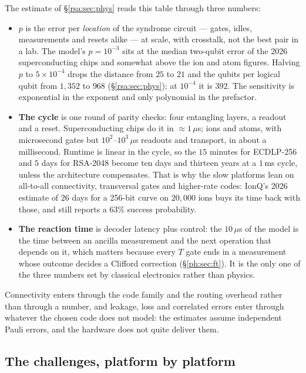 The estimate of \S\ref{rsa:sec:phys} reads this table through three numbers:
\begin{itemize}\setlength\itemsep{2pt}
\item \textbf{$p$} is the error per \emph{location} of the syndrome circuit --- gates, idles,
  measurements and resets alike --- at scale, with crosstalk, not the best pair in a lab. The
  model's $p=10^{-3}$ sits at the median two-qubit error of the 2026 superconducting chips and
  somewhat above the ion and atom figures. Halving $p$ to $5\times10^{-4}$ drops the distance from
  $25$ to $21$ and the qubits per logical qubit from $1,352$ to $968$ (\S\ref{rsa:sec:phys}); at
  $10^{-4}$ it is $392$. The sensitivity is exponential in the exponent and only polynomial in
  the prefactor.
\item \textbf{The cycle} is one round of parity checks: four entangling layers, a readout and a
  reset. Superconducting chips do it in $\approx1\,\mu$s; ions and atoms, with microsecond gates
  but $10^2$--$10^3\,\mu$s readouts and transport, in about a millisecond. Runtime is linear in
  the cycle, so the $15$ minutes for ECDLP-256 and $5$ days for RSA-2048 become ten days and
  thirteen years at a $1$\,ms cycle, unless the architecture compensates. That is why the slow
  platforms lean on all-to-all connectivity, transversal gates and higher-rate codes: IonQ's
  2026 estimate of $26$ days for a 256-bit curve on $20,000$ ions \cite{ec:ionq26} buys its time
  back with those, and still reports a $63\%$ success probability.
\item \textbf{The reaction time} is decoder latency plus control: the $10\,\mu$s of the model is
  the time between an ancilla measurement and the next operation that depends on it, which
  matters because every $T$ gate ends in a measurement whose outcome decides a Clifford
  correction (\S\ref{ph:sec:ft}). It is the only one of the three numbers set by classical
  electronics rather than physics.
\end{itemize}
Connectivity enters through the code family and the routing overhead rather than through a
number, and leakage, loss and correlated errors enter through whatever the chosen code does not
model: the estimates assume independent Pauli errors, and the hardware does not quite deliver
them.

\subsection{The challenges, platform by platform}

